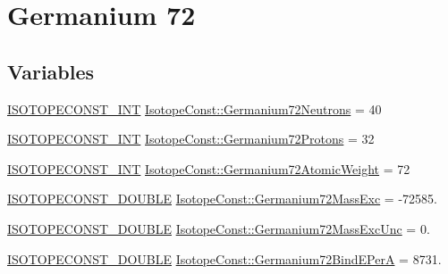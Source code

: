 \hypertarget{group___isotope_const-_germanium-_ge72}{}\section{Germanium 72}
\label{group___isotope_const-_germanium-_ge72}
\subsection*{Variables}
\begin{DoxyCompactItemize}
\item 
\mbox{\hyperlink{group___isotope_const-_macros_ga5f18360b3e99483a35c32d789e62621c}{I\+S\+O\+T\+O\+P\+E\+C\+O\+N\+S\+T\+\_\+\+I\+NT}} \mbox{\hyperlink{group___isotope_const-_germanium-_ge72_ga75bd9a60805429ba89b7d782c804ca01}{Isotope\+Const\+::\+Germanium72\+Neutrons}} = 40
\item 
\mbox{\hyperlink{group___isotope_const-_macros_ga5f18360b3e99483a35c32d789e62621c}{I\+S\+O\+T\+O\+P\+E\+C\+O\+N\+S\+T\+\_\+\+I\+NT}} \mbox{\hyperlink{group___isotope_const-_germanium-_ge72_ga216fd327c3da197649bf978169bd65b9}{Isotope\+Const\+::\+Germanium72\+Protons}} = 32
\item 
\mbox{\hyperlink{group___isotope_const-_macros_ga5f18360b3e99483a35c32d789e62621c}{I\+S\+O\+T\+O\+P\+E\+C\+O\+N\+S\+T\+\_\+\+I\+NT}} \mbox{\hyperlink{group___isotope_const-_germanium-_ge72_ga4c5b92f34cc89e4ad329ca9705bbf989}{Isotope\+Const\+::\+Germanium72\+Atomic\+Weight}} = 72
\item 
\mbox{\hyperlink{group___isotope_const-_macros_ga8f45a7272ce02c0b4c65c44636ed719a}{I\+S\+O\+T\+O\+P\+E\+C\+O\+N\+S\+T\+\_\+\+D\+O\+U\+B\+LE}} \mbox{\hyperlink{group___isotope_const-_germanium-_ge72_gaad2c5ec854f3e734c95ac56a0ac456a0}{Isotope\+Const\+::\+Germanium72\+Mass\+Exc}} = -\/72585.
\item 
\mbox{\hyperlink{group___isotope_const-_macros_ga8f45a7272ce02c0b4c65c44636ed719a}{I\+S\+O\+T\+O\+P\+E\+C\+O\+N\+S\+T\+\_\+\+D\+O\+U\+B\+LE}} \mbox{\hyperlink{group___isotope_const-_germanium-_ge72_ga7ba78b2c00845c12a13e75d661b5b903}{Isotope\+Const\+::\+Germanium72\+Mass\+Exc\+Unc}} = 0.
\item 
\mbox{\hyperlink{group___isotope_const-_macros_ga8f45a7272ce02c0b4c65c44636ed719a}{I\+S\+O\+T\+O\+P\+E\+C\+O\+N\+S\+T\+\_\+\+D\+O\+U\+B\+LE}} \mbox{\hyperlink{group___isotope_const-_germanium-_ge72_ga4a4b0caa9aebfff2bb9b258888018cc2}{Isotope\+Const\+::\+Germanium72\+Bind\+E\+PerA}} = 8731.
\item 

\end{DoxyCompactItemize}
